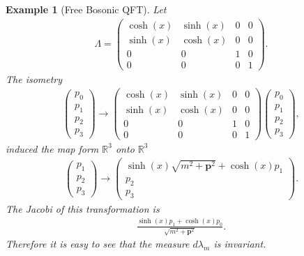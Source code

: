 \documentclass[a4paper,10pt]{amsart}
\newtheorem{example}{Example}[section]
\newcommand{\R}{\mathbb R}  %
\begin{document}
\begin{example}[Free Bosonic QFT]
    Let 
    \begin{align*}
        \Lambda = \begin{pmatrix}
            \cosh(x) & \sinh(x) & 0 & 0\\
            \sinh(x) & \cosh(x) & 0 & 0 \\
            0 & 0 & 1 & 0\\
            0 & 0 & 0 & 1
        \end{pmatrix}. 
    \end{align*}
    The isometry 
    \begin{align*}
        \begin{pmatrix}
           p_0 \\
           p_1 \\
           p_2 \\
           p_3
        \end{pmatrix}
        \to
        \begin{pmatrix}
            \cosh(x) & \sinh(x) & 0 & 0\\
            \sinh(x) & \cosh(x) & 0 & 0 \\
            0 & 0 & 1 & 0\\
            0 & 0 & 0 & 1
        \end{pmatrix}
        \begin{pmatrix}
           p_0 \\
           p_1 \\
           p_2 \\
           p_3
        \end{pmatrix},
    \end{align*}
    induced the map form $\R^{3}$ onto $\R^{3}$
    \begin{align*}
        \begin{pmatrix}
           p_1 \\
           p_2 \\
           p_3
        \end{pmatrix}
        \to 
        \begin{pmatrix}
            \sinh(x)\sqrt{m^2+\mathbf{p}^2} + \cosh(x)p_1 \\
           p_2 \\
           p_3
        \end{pmatrix}.
    \end{align*}
    The Jacobi of this transformation is
    \begin{align*}
        \frac{\sinh(x)p_1 + \cosh(x)p_0}{\sqrt{m^2+\mathbf{p}^2}}. 
    \end{align*}
    Therefore it is easy to see that the measure $d\lambda_m$ is invariant.
     


\end{example}
\end{document}

